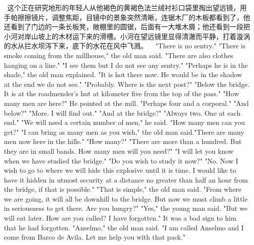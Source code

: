 {	 这个正在研究地形的年轻人从他褐色的黄褐色法兰绒衬衫口袋里掏出望远镜，用手帕擦擦镜片，调整焦距，目镜中的景象突然清晰，连锯木厂的木板都看到了，他还看到了门边的一条长板凳，敞棚里的圆锯，后面有一大堆木屑；他还看到一段把小河对岸山坡上的木材运下来的滑槽。小河在望远镜里显得清澈而平静，打着漩涡的水从拦水坝泻下来，底下的水花在风中飞溅。
	 
	"There is no sentry." "There is smoke coming from the millhouse," the old man said. "There are also clothes hanging on a line." "I see them but I do not see any sentry." "Perhaps he is in the shade," the old man explained. "It is hot there now. He would be in the shadow at the end we do not see." "Probably. Where is the next post?" "Below the bridge. It is at the roadmender's hut at kilometer five from the top of the pass." "How many men are here?" He pointed at the mill.
	 "Perhaps four and a corporal." "And below?" "More. I will find out." "And at the bridge?" "Always two. One at each end." "We will need a certain number of men," he said. "How many men can you get?" "I can bring as many men as you wish," the old man said."There are many men now here in the hills." "How many?" "There are more than a hundred. But they are in small bands. How many men will you need?" "I will let you know when we have studied the bridge." "Do you wish to study it now?" "No. Now I wish to go to where we will hide this explosive until it is time. I would like to have it hidden in utmost security at a distance no greater than half an hour from the bridge, if that is possible." "That is simple," the old man said. "From where we are going, it will all be downhill to the bridge. But now we must climb a little in seriousness to get there. Are you hungry?" "Yes," the young man said. "But we will eat later. How are you called? I have forgotten." It was a bad sign to him that he had forgotten. "Anselmo," the old man said. "I am called Anselmo and I come from Barco de Avila. Let me help you with that pack."
	 
}
